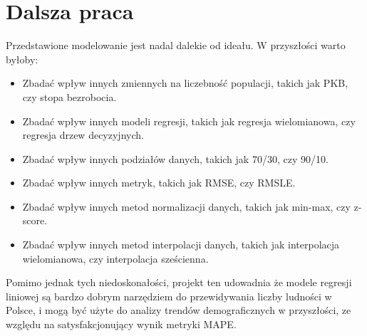 \documentclass[11pt]{article}
\begin{document}
\section*{Dalsza praca}
Przedstawione modelowanie jest nadal dalekie od ideału. W przyszłości warto byłoby:
\begin{itemize}
\item Zbadać wpływ innych zmiennych na liczebność populacji, takich jak PKB, czy stopa bezrobocia.
\item Zbadać wpływ innych modeli regresji, takich jak regresja wielomianowa, czy regresja drzew decyzyjnych.
\item Zbadać wpływ innych podziałów danych, takich jak 70/30, czy 90/10.
\item Zbadać wpływ innych metryk, takich jak RMSE, czy RMSLE.
\item Zbadać wpływ innych metod normalizacji danych, takich jak min-max, czy z-score.
\item Zbadać wpływ innych metod interpolacji danych, takich jak interpolacja wielomianowa, czy interpolacja sześcienna.
\end{itemize}
Pomimo jednak tych niedoskonałości, projekt ten udowadnia że modele regresji liniowej są bardzo dobrym narzędziem do przewidywania liczby ludności w Polsce, i mogą być użyte do analizy trendów demograficznych w przyszłości, ze względu
na satysfakcjonujący wynik metryki MAPE.


\end{document}
